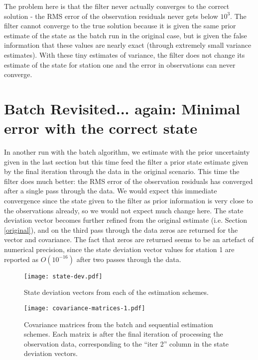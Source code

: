 \documentclass[a4paper,11pt]{article}
\begin{document}
	The problem here is that the filter never actually converges to the correct solution - the RMS error of the observation residuals never gets below $10^3$. The filter cannot converge to the true solution because it is given the same prior estimate of the state as the batch run in the original case, but is given the false information that these values are nearly exact (through extremely small variance estimates). With these tiny estimates of variance, the filter does not change its estimate of the state for station one and the error in observations can never converge. 

\section{Batch Revisited... again: Minimal error with the correct state}
\label{prob6}

	In another run with the batch algorithm, we estimate with the prior uncertainty given in the last section but this time feed the filter a prior state estimate given by the final iteration through the data in the original scenario. This time the filter does much better: the RMS error of the observation residuals has converged after a single pass through the data. We would expect this immediate convergence since the state given to the filter as prior information is very close to the observations already, so we would not expect much change here. The state deviation vector becomes further refined from the original estimate (i.e. Section \ref{original}), and on the third pass through the data zeros are returned for the vector and covariance. The fact that zeros are returned seems to be an artefact of numerical precision, since the state deviation vector values for station 1 are reported as $O(10^{-16})$ after two passes through the data. 
	
	\begin{figure}[hb]
	\centering
	\texttt{[image: state-dev.pdf]}
	\caption{State deviation vectors from each of the estimation schemes.}
	\label{fig:state-dev}
	\end{figure}
	
	\begin{figure}
	\centering
	\texttt{[image: covariance-matrices-1.pdf]}
	\caption{Covariance matrices from the batch and sequential estimation schemes. Each matrix is after the final iteration of processing the observation data, corresponding to the ``iter 2'' column in the state deviation vectors.} 
	\label{fig:covariance1}
	\end{figure}
\end{document}
